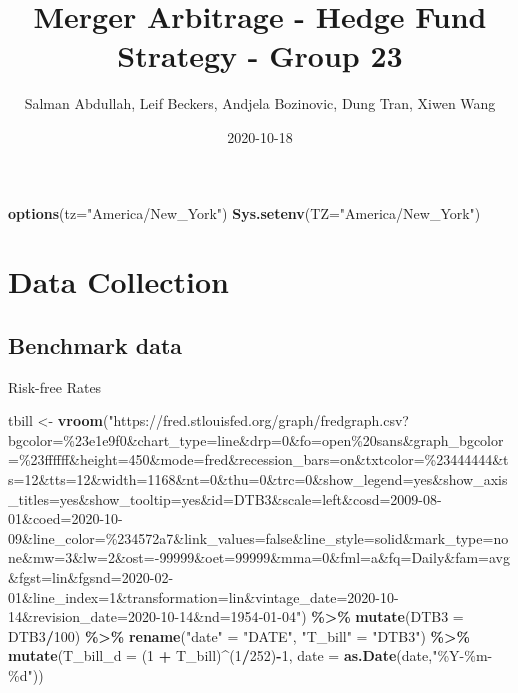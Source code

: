 \documentclass[
]{article}
\title{Merger Arbitrage - Hedge Fund Strategy - Group 23}
\author{Salman Abdullah, Leif Beckers, Andjela Bozinovic, Dung Tran,
Xiwen Wang}
\date{2020-10-18}
\newenvironment{Shaded}{\begin{snugshade}}{\end{snugshade}}
\newcommand{\DataTypeTok}[1]{\textcolor[rgb]{0.13,0.29,0.53}{#1}}
\newcommand{\DecValTok}[1]{\textcolor[rgb]{0.00,0.00,0.81}{#1}}
\newcommand{\KeywordTok}[1]{\textcolor[rgb]{0.13,0.29,0.53}{\textbf{#1}}}
\newcommand{\NormalTok}[1]{#1}
\newcommand{\OperatorTok}[1]{\textcolor[rgb]{0.81,0.36,0.00}{\textbf{#1}}}
\newcommand{\StringTok}[1]{\textcolor[rgb]{0.31,0.60,0.02}{#1}}
\begin{document}
\maketitle

{
\setcounter{tocdepth}{2}
\tableofcontents
}
\begin{Shaded}
\begin{Highlighting}[]
\KeywordTok{options}\NormalTok{(}\DataTypeTok{tz=}\StringTok{"America/New\_York"}\NormalTok{)}
\KeywordTok{Sys.setenv}\NormalTok{(}\DataTypeTok{TZ=}\StringTok{"America/New\_York"}\NormalTok{)}
\end{Highlighting}
\end{Shaded}

\hypertarget{data-collection}{%
\section{Data Collection}\label{data-collection}}

\hypertarget{benchmark-data}{%
\subsection{Benchmark data}\label{benchmark-data}}

Risk-free Rates

\begin{Shaded}
\begin{Highlighting}[]
\NormalTok{tbill \textless{}{-}}\StringTok{ }\KeywordTok{vroom}\NormalTok{(}\StringTok{"https://fred.stlouisfed.org/graph/fredgraph.csv?bgcolor=\%23e1e9f0\&chart\_type=line\&drp=0\&fo=open\%20sans\&graph\_bgcolor=\%23ffffff\&height=450\&mode=fred\&recession\_bars=on\&txtcolor=\%23444444\&ts=12\&tts=12\&width=1168\&nt=0\&thu=0\&trc=0\&show\_legend=yes\&show\_axis\_titles=yes\&show\_tooltip=yes\&id=DTB3\&scale=left\&cosd=2009{-}08{-}01\&coed=2020{-}10{-}09\&line\_color=\%234572a7\&link\_values=false\&line\_style=solid\&mark\_type=none\&mw=3\&lw=2\&ost={-}99999\&oet=99999\&mma=0\&fml=a\&fq=Daily\&fam=avg\&fgst=lin\&fgsnd=2020{-}02{-}01\&line\_index=1\&transformation=lin\&vintage\_date=2020{-}10{-}14\&revision\_date=2020{-}10{-}14\&nd=1954{-}01{-}04"}\NormalTok{) }\OperatorTok{\%\textgreater{}\%}
\StringTok{  }\KeywordTok{mutate}\NormalTok{(}\DataTypeTok{DTB3 =}\NormalTok{ DTB3}\OperatorTok{/}\DecValTok{100}\NormalTok{) }\OperatorTok{\%\textgreater{}\%}
\StringTok{  }\KeywordTok{rename}\NormalTok{(}\StringTok{"date"}\NormalTok{ =}\StringTok{ "DATE"}\NormalTok{,}
         \StringTok{"T\_bill"}\NormalTok{ =}\StringTok{ "DTB3"}\NormalTok{) }\OperatorTok{\%\textgreater{}\%}\StringTok{ }
\StringTok{  }\KeywordTok{mutate}\NormalTok{(}\DataTypeTok{T\_bill\_d =}\NormalTok{ (}\DecValTok{1} \OperatorTok{+}\StringTok{ }\NormalTok{T\_bill)}\OperatorTok{\^{}}\NormalTok{(}\DecValTok{1}\OperatorTok{/}\DecValTok{252}\NormalTok{)}\OperatorTok{{-}}\DecValTok{1}\NormalTok{,}
         \DataTypeTok{date =} \KeywordTok{as.Date}\NormalTok{(date,}\StringTok{"\%Y{-}\%m{-}\%d"}\NormalTok{))}
\end{Highlighting}
\end{Shaded}
\end{document}
